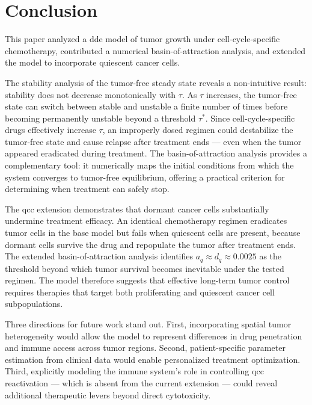 \section{Conclusion}
\label{sec:conclusion}

This paper analyzed a \gls{dde} model of tumor growth under cell-cycle-specific
chemotherapy, contributed a numerical basin-of-attraction analysis, and extended the
model to incorporate quiescent cancer cells.

The stability analysis of the tumor-free steady state reveals a non-intuitive result: stability does not decrease monotonically with $\tau$. As $\tau$ increases, the tumor-free state can switch between stable and unstable a finite number of times before becoming permanently unstable beyond a threshold $\tau^*$. Since cell-cycle-specific drugs effectively increase $\tau$, an improperly dosed regimen could destabilize the tumor-free state and cause relapse after treatment ends --- even when the tumor appeared eradicated during treatment. The basin-of-attraction analysis provides a complementary tool: it numerically maps the initial conditions from which the system converges to tumor-free equilibrium, offering a practical criterion for determining when treatment can safely stop.

The \gls{qcc} extension demonstrates that dormant cancer cells substantially undermine treatment efficacy. An identical chemotherapy regimen eradicates tumor cells in the base model but fails when quiescent cells are present, because dormant cells survive the drug and repopulate the tumor after treatment ends. The extended basin-of-attraction analysis identifies $a_q \approx d_q \approx 0.0025$ as the threshold beyond which tumor survival becomes inevitable under the tested regimen. The model therefore suggests that effective long-term tumor control requires therapies that target both proliferating and quiescent cancer cell subpopulations.

Three directions for future work stand out. First, incorporating spatial tumor heterogeneity would allow the model to represent differences in drug penetration and immune access across tumor regions. Second, patient-specific parameter estimation from clinical data would enable personalized treatment optimization. Third, explicitly modeling the immune system's role in controlling \gls{qcc} reactivation --- which is absent from the current extension --- could reveal additional therapeutic levers beyond direct cytotoxicity.
